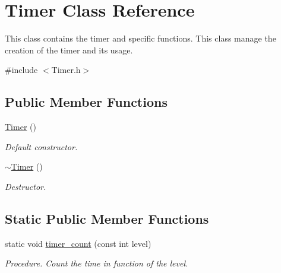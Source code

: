 \hypertarget{classTimer}{}\section{Timer Class Reference}
\label{classTimer}


This class contains the timer and specific functions. This class manage the creation of the timer and its usage.  




{\ttfamily \#include $<$Timer.\+h$>$}

\subsection*{Public Member Functions}
\begin{DoxyCompactItemize}
\item 
\hyperlink{classTimer_a5f16e8da27d2a5a5242dead46de05d97}{Timer} ()\hypertarget{classTimer_a5f16e8da27d2a5a5242dead46de05d97}{}\label{classTimer_a5f16e8da27d2a5a5242dead46de05d97}

\begin{DoxyCompactList}\small\item\em Default constructor. \end{DoxyCompactList}\item 
\hyperlink{classTimer_a14fa469c4c295c5fa6e66a4ad1092146}{$\sim$\+Timer} ()\hypertarget{classTimer_a14fa469c4c295c5fa6e66a4ad1092146}{}\label{classTimer_a14fa469c4c295c5fa6e66a4ad1092146}

\begin{DoxyCompactList}\small\item\em Destructor. \end{DoxyCompactList}\end{DoxyCompactItemize}
\subsection*{Static Public Member Functions}
\begin{DoxyCompactItemize}
\item 
static void \hyperlink{classTimer_a6c4ede7eba60ef2ea55e6f62b57f46fe}{timer\+\_\+count} (const int level)
\begin{DoxyCompactList}\small\item\em Procedure. Count the time in function of the level. \end{DoxyCompactList}\end{DoxyCompactItemize}


